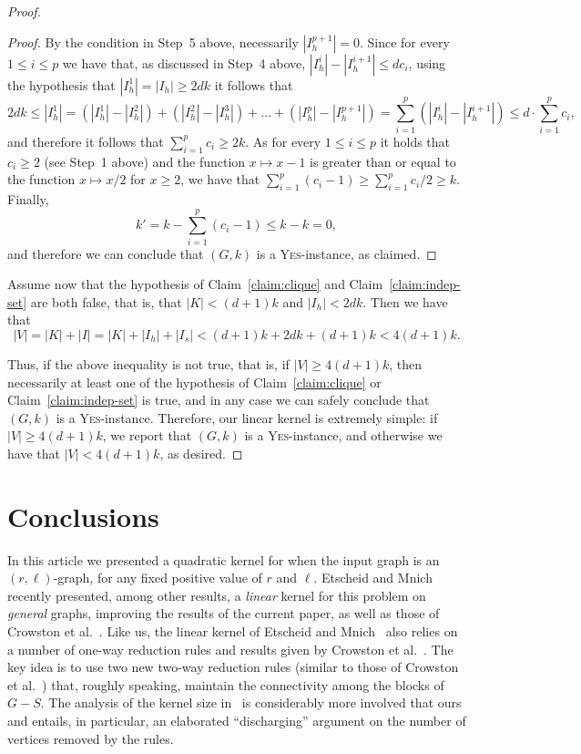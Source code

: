\documentclass[
final
]{dmtcs-episciences}
\begin{document}
\begin{proof}
\begin{proof}
By the condition in Step~5 above, necessarily $|I_h^{p+1}| = 0$. Since for every $1 \leq i \leq p$ we have that, as discussed in Step~4 above, $ |I_h^{i}| - |I_h^{i+1}| \leq  dc_i$, using the hypothesis that $|I_h^1| = |I_h|\geq 2dk$ it follows that
$$
2dk \leq |I_h^1| = (|I_h^1| - |I_h^2|) + (|I_h^2|-|I_h^3|) + \ldots +  (|I_h^p| - |I_h^{p+1}|) = \sum_{i=1}^p (|I_h^i| - |I_h^{i+1}|) \leq d \cdot \sum_{i=1}^p c_i,
$$
and therefore it follows that $\sum_{i=1}^p c_i \geq 2k$. As for every $1 \leq i \leq p$ it holds that $c_i \geq 2$ (see Step~1 above) and the function $x \mapsto x-1$ is greater than or equal to the function $x \mapsto x/2$ for $x \geq 2$, we have that $\sum_{i=1}^p (c_i - 1) \geq \sum_{i=1}^p c_i / 2 \geq k$. Finally,
$$
k' = k - \sum_{i=1}^p (c_i -1) \leq  k - k = 0,
$$
and therefore we can conclude that  $(G,k)$ is a \textsc{Yes}-instance, as claimed.
\end{proof}

Assume now that the hypothesis of Claim~\ref{claim:clique} and Claim~\ref{claim:indep-set} are both false, that is, that $|K| < (d+1)k$ and $|I_h| < 2dk$. Then we have that
$$
|V| = |K| + |I| = |K| + |I_h| + |I_s| < (d+1)k + 2dk + (d+1)k < 4(d+1)k.
$$

Thus, if the above inequality is not true, that is, if $|V| \geq 4(d+1)k$, then necessarily at least one of the hypothesis of Claim~\ref{claim:clique} or Claim~\ref{claim:indep-set} is true, and in any case we can safely conclude that $(G,k)$ is a \textsc{Yes}-instance. Therefore, our linear kernel is extremely simple: if $|V| \geq 4(d+1)k$, we report that $(G,k)$ is a \textsc{Yes}-instance, and otherwise we have that $|V| < 4(d+1)k$, as desired.\end{proof}


\newpage

\section{Conclusions}
\label{sec:conclusions}



In this article we presented a quadratic kernel for  {} when the input graph is an $(r, \ell)$-graph, for any fixed positive value of $r$ and $\ell$. Etscheid and Mnich~\cite{EtscheidM16} recently presented, among other results, a {\sl linear} kernel for this problem on {\sl general} graphs, improving the results of the current paper, as well as those of Crowston et al.~\cite{crowston2012max}. Like us, the linear kernel of Etscheid and Mnich~\cite{EtscheidM16} also relies on a number of one-way reduction rules and results given by Crowston et al.~\cite{crowston2012max}. The key idea is to use two new two-way reduction rules (similar to those of Crowston et al.~\cite{crowston2012max}) that, roughly speaking, maintain the connectivity among the blocks of $G-S$. The analysis of the kernel size in~\cite{EtscheidM16} is considerably more involved that ours and entails, in particular, an elaborated ``discharging'' argument on the number of vertices removed by the rules.
\end{document}
